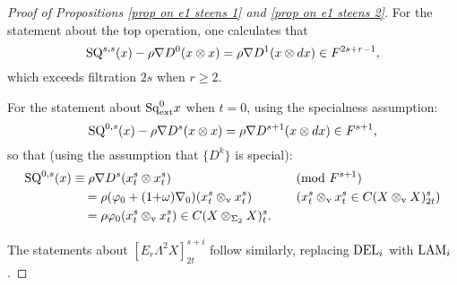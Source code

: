 \documentclass[11pt]{amsart} \renewcommand{\baselinestretch}{1.2}
\theoremstyle{plain}
\newtheorem{prop}[thm]{Proposition}
\numberwithin{equation}{section} %
\theoremstyle{plain}
\newtheorem{prop}[thm]{Proposition}
\numberwithin{equation}{chapter} %
\let\oldphi\phi
\let\phi\varphi
\renewcommand{\to}{\longrightarrow}
\newcommand{\twist}{\omega}
\newcommand{\Nabla}{\nabla}
\newcommand{\Sq}{\mathrm{Sq}}
\newcommand{\Edownup}[5]{[E_{#1}^{#2}#3]^{#4}_{#5}}
\newcommand{\dver}{_\mathrm{v}}
\renewcommand{\mapsto}{\longmapsto}
\begin{document}
\begin{second quadrant homotopy sseq operations}
\begin{proof}[Proof of Propositions \ref{prop on e1 steens 1} and \ref{prop on e1 steens 2}]
For the statement about the top operation, one calculates that
\[\textup{SQ}^{s,s}(x)-\rho\Nabla D^0(x\otimes x)=\rho\nabla D^{1}(x\otimes dx)\in F^{2s+r-1},\] which exceeds filtration $2s$ when $r\geq2$.



For the statement about $\Sq_\textup{ext}^0x$ when $t=0$, using the specialness assumption:
\[\textup{SQ}^{0,s}(x)-\rho\Nabla D^s(x\otimes x)=\rho\Nabla D^{s+1}(x\otimes dx) \in F^{s+1},\]
so that (using the assumption that $\{D^k\}$ is special):
\begin{alignat*}{2}
\textup{SQ}^{0,s}(x)
&\equiv
\rho\Nabla D^s(x^s_t\otimes x^s_t)&&\textup{(mod $F^{s+1}$)}%
\\
&\quad =
\rho(\oldphi_0+(1{+}\twist)\Nabla_0)(x^s_t\otimes\dver x^s_t)%
&\quad&\text{($x^s_t\otimes\dver x^s_t\in C(X\otimes\dver X)_{2t}^{s}$)}\\
&\quad =
\rho\oldphi_0(x^s_t\otimes\dver x^s_t)\in C(X\otimes_{\Sigma_2} X)_{t}^{s}.
\end{alignat*}

The statements about $\Edownup{r}{}{\Lambda^2X}{s+i}{2t}$ follow similarly, replacing  $\textup{DEL}_i$ with $\textup{LAM}_i$.\end{proof}


\end{second quadrant homotopy sseq operations}
\end{document}
